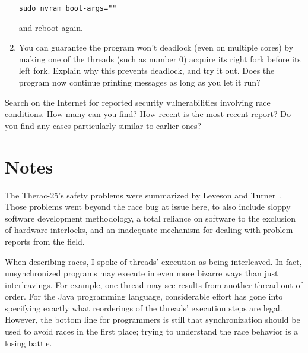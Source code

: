 \begin{chapterEnumerate}
\begin{enumerate}
\begin{verbatim}
sudo nvram boot-args=""
\end{verbatim}
and reboot again.
\item
You can guarantee the program won't deadlock (even on multiple cores)
by making one of the
threads (such as number 0) acquire its right fork before its left fork.
Explain why this prevents deadlock, and try it out.
Does the program now continue printing messages as long as you let it
run?
\end{enumerate}
\item
Search on the Internet for reported security vulnerabilities involving
race conditions.  How many can you find?  How recent is the most
recent report?  Do you find any cases particularly similar to earlier ones?
\end{chapterEnumerate}

\section*{Notes}
The Therac-25's safety problems were summarized by
Leveson and
Turner~\cite{max800}.  Those problems went beyond the race bug at
issue here, to also include sloppy software development methodology, a
total reliance on software to the exclusion of hardware interlocks,
and an inadequate mechanism for dealing with problem reports from the
field.

When describing races, I spoke of threads' execution as being
interleaved.  In fact, unsynchronized programs may execute in even
more bizarre ways than just interleavings.  For example, one thread
may see results from another thread out of order.  For the Java programming
language, considerable effort has gone into specifying exactly what
reorderings of the threads' execution steps are legal.  However, the
bottom line for programmers is still that synchronization should be
used to avoid races in the first place; trying to understand the race
behavior is a losing battle.

